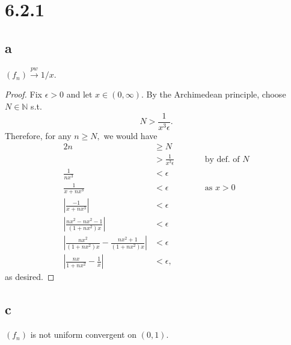 \documentclass[10pt]{article}
\begin{document}
\section*{6.2.1}
\subsection*{a}

$(f_n)\stackrel{pw}{\to} 1/x.$

\begin{proof}
    Fix $\epsilon > 0$ and let $x\in (0,\infty).$ By the Archimedean principle, choose $N\in\mathbb{N}$ s.t.
    \[N> \frac{1}{x^3\epsilon}.\]
    Therefore, for any $n\ge N,$ we would have
    \begin{alignat*}{2}
        n &\ge N\\
        &>\frac{1}{x^3\epsilon} \qquad&&\text{by def. of $N$}\\
        \frac{1}{nx^3}&<\epsilon\\
        \frac{1}{x+nx^3}&<\epsilon &&\text{as $x>0$}\\
        \left | \frac{-1}{x+nx^3}\right | &< \epsilon &&\\
        \left | \frac{nx^2-nx^2-1}{(1+nx^2)x} \right |&<\epsilon\\
        \left | \frac{nx^2}{(1+nx^2)x}-\frac{nx^2+1}{(1+nx^2)x}\right | &<\epsilon\\
        \left | \frac{nx}{1+nx^2} - \frac{1}{x} \right | &<\epsilon,
    \end{alignat*}
    as desired.
\end{proof}



\subsection*{c}

$(f_n)$ is not uniform convergent on $(0,1).$
\end{document}
